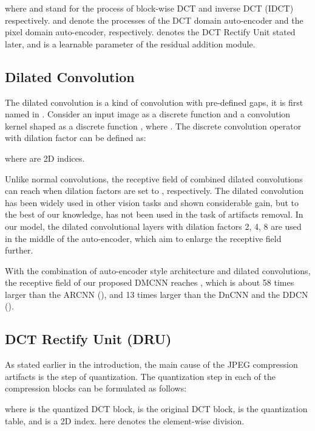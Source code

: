\documentclass{article}
\begin{document}
where  and  stand for the process of
 block-wise DCT and inverse DCT (IDCT) respectively. 
and  denote the processes of the DCT domain auto-encoder and
the pixel domain auto-encoder, respectively.  denotes
the DCT Rectify Unit stated later, and  is a learnable parameter of
the residual addition module.
\vspace{-0.2cm}

\subsection{Dilated Convolution}
\label{ssec:diconv}

The dilated convolution is a kind of convolution with pre-defined gaps,
it is first named in \cite{YuKoltun2016}. Consider
an input image  as a discrete function 
and a convolution kernel  shaped  as a discrete function
, where .
The discrete convolution operator  with dilation factor  can
be defined as:


where  are 2D indices.

Unlike normal convolutions, the receptive field of  combined
dilated convolutions can reach  when
dilation factors are set to , respectively.
The dilated convolution has been widely used in other vision tasks
\cite{chen2016deeplab,wang2017large} and shown considerable gain,
but to the best of our knowledge, has not been used in the
task of artifacts removal. In our model, the dilated convolutional layers
with dilation factors 2, 4, 8 are used in the middle of the auto-encoder,
which aim to enlarge the receptive field further.

With the combination of auto-encoder style architecture and
dilated convolutions, the receptive field of our proposed DMCNN reaches
, which is about 58 times larger than the ARCNN
(), and 13 times larger than the DnCNN and
the DDCN ().
\vspace{-0.2cm}

\subsection{DCT Rectify Unit (DRU)}
\label{ssec:dru}

As stated earlier in the introduction, the main cause of the
JPEG compression artifacts is the step of quantization. The quantization step
in each of the  compression blocks can be formulated as follows:

where  is the quantized DCT block,  is
the original DCT block,  is the quantization table, and
 is a 2D index.  here denotes
the element-wise division.
\end{document}
